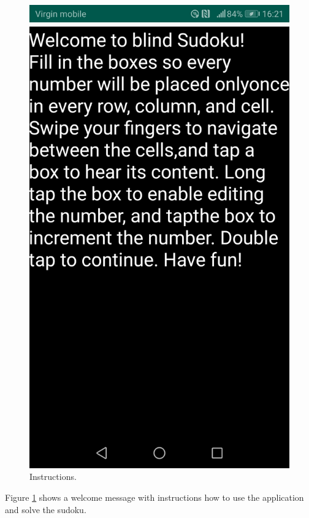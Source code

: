 \documentclass[a4paper,twoside,12pt]{book}
\begin{document}
\iffalse
\begin{figure}
\centering
  \includegraphics[width=\linewidth/2]{instructions.jpg}
  \caption{Instructions.}
  \label{fig:Game instructions}
\end{figure}

Figure \ref{fig:Game instructions} shows a welcome message with instructions how to use the application and solve the sudoku.
\end{document}
